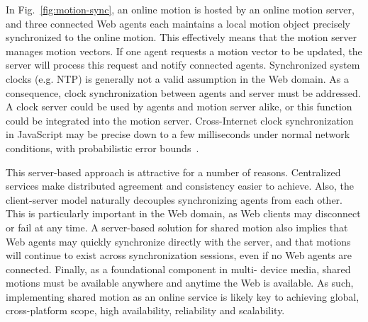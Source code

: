 In Fig.~\ref{fig:motion-sync}, an online motion is hosted by an online motion server, and three
connected Web agents each maintains a local motion object precisely synchronized to the
online motion. This effectively means that the motion server manages motion
vectors. If one agent requests a motion vector to be updated, the server will
process this request and notify connected agents. Synchronized system clocks
(e.g. NTP) is generally not a valid assumption in the Web domain. As a
consequence, clock synchronization between agents and server must be
addressed. A clock server could be used by agents and motion server alike, or
this function could be integrated into the motion server. Cross-Internet clock
synchronization in JavaScript may be precise down to a few milliseconds
under normal network conditions, with probabilistic error bounds~\cite{msv, syncreport1, syncreport2}.

This server-based approach is attractive for a number of reasons. Centralized
services make distributed agreement and consistency easier to achieve. Also,
the client-server model naturally decouples synchronizing agents from each
other. This is particularly important in the Web domain, as Web clients may
disconnect or fail at any time. A server-based solution for shared motion also
implies that Web agents may quickly synchronize directly with the server, and
that motions will continue to exist across synchronization sessions, even if
no Web agents are connected. Finally, as a foundational component in multi-
device media, shared motions must be available anywhere and anytime the Web is
available. As such, implementing shared motion as an online service is likely
key to achieving global, cross-platform scope, high availability, reliability
and scalability.





